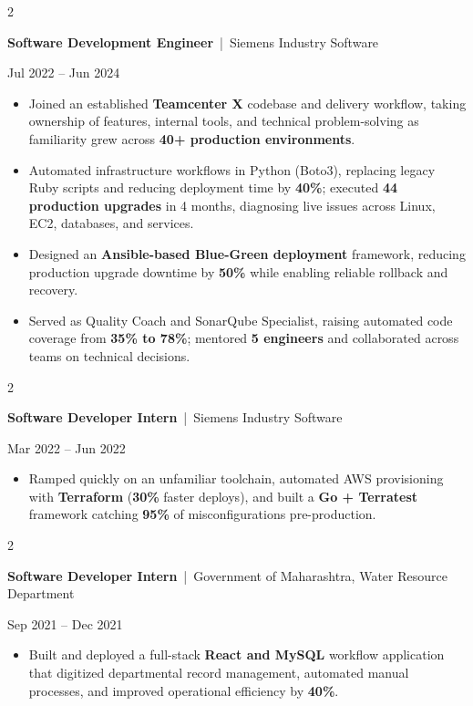 \documentclass[10pt, letterpaper]{article}
\newenvironment{highlights}{
    \begin{itemize}[
        topsep=0.10 cm,
        parsep=0.06 cm,
        partopsep=0pt,
        itemsep=0.06 cm,
        leftmargin=12pt
    ]
}{
    \end{itemize}
}
\newenvironment{twocolentry}[2][]{
    \onecolentry
    \def\secondColumn{#2}
    \setcolumnwidth{\fill, 4.5 cm}
    \begin{paracol}{2}
}{
    \switchcolumn \raggedleft \secondColumn
    \end{paracol}
    \endonecolentry
}
\begin{document}
\vspace{0.15 cm}

\begin{twocolentry}{Jul 2022 -- Jun 2024}
\textbf{Software Development Engineer} \,|\, Siemens Industry Software
\end{twocolentry}
\begin{highlights}
  \item Joined an established \textbf{Teamcenter X} codebase and delivery workflow, taking ownership of features, internal tools, and technical problem-solving as familiarity grew across \textbf{40+ production environments}.
  \item Automated infrastructure workflows in Python (Boto3), replacing legacy Ruby scripts and reducing deployment time by \textbf{40\%}; executed \textbf{44 production upgrades} in 4 months, diagnosing live issues across Linux, EC2, databases, and services.
  \item Designed an \textbf{Ansible-based Blue-Green deployment} framework, reducing production upgrade downtime by \textbf{50\%} while enabling reliable rollback and recovery.
  \item Served as Quality Coach and SonarQube Specialist, raising automated code coverage from \textbf{35\% to 78\%}; mentored \textbf{5 engineers} and collaborated across teams on technical decisions.
\end{highlights}

\vspace{0.15 cm}

\begin{twocolentry}{Mar 2022 -- Jun 2022}
\textbf{Software Developer Intern} \,|\, Siemens Industry Software
\end{twocolentry}
\begin{highlights}
  \item Ramped quickly on an unfamiliar toolchain, automated AWS provisioning with \textbf{Terraform} (\textbf{30\%} faster deploys), and built a \textbf{Go + Terratest} framework catching \textbf{95\%} of misconfigurations pre-production.
\end{highlights}

\vspace{0.15 cm}

\begin{twocolentry}{Sep 2021 -- Dec 2021}
\textbf{Software Developer Intern} \,|\, Government of Maharashtra, Water Resource Department
\end{twocolentry}
\begin{highlights}
  \item Built and deployed a full-stack \textbf{React and MySQL} workflow application that digitized departmental record management, automated manual processes, and improved operational efficiency by \textbf{40\%}.
\end{highlights}
\end{document}
